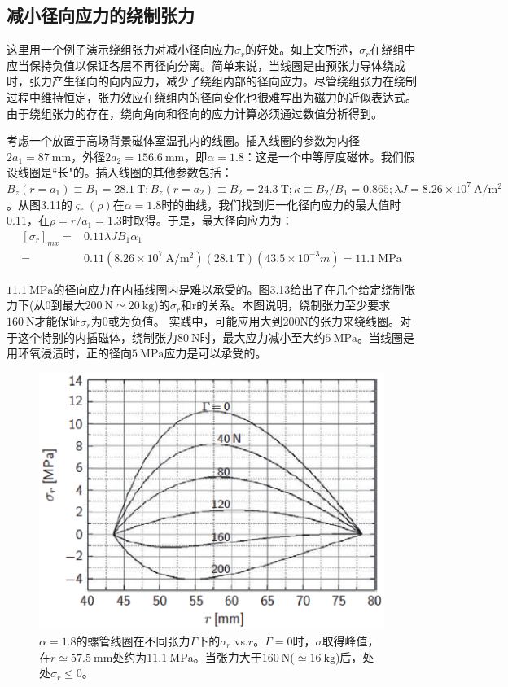 \subsection{减小径向应力的绕制张力}
这里用一个例子演示绕组张力对减小径向应力$\sigma_{r}$的好处。如上文所述，$\sigma_{r}$在绕组中应当保持负值以保证各层不再径向分离。简单来说，当线圈是由预张力导体绕成时，张力产生径向的向内应力，减少了绕组内部的径向应力。尽管绕组张力在绕制过程中维持恒定，张力效应在绕组内的径向变化也很难写出为磁力的近似表达式。由于绕组张力的存在，绕向角向和径向的应力计算必须通过数值分析得到。

考虑一个放置于高场背景磁体室温孔内的线圈。插入线圈的参数为内径$2a_1=87\ \mathrm{mm}$，外径$2a_2=156.6\ \mathrm{mm}$，即$\alpha = 1.8$：这是一个中等厚度磁体。我们假设线圈是``长"的。插入线圈的其他参数包括：
$B_z(r=a_1)\equiv B_1 =28.1\ \mathrm{T}; B_z(r=a_2)\equiv B_2 =24.3\ \mathrm{T};\kappa\equiv B_2/B_1 = 0.865; \lambda J =8.26×10^7 \ \mathrm{A/m^2}$。从图3.11的$\varsigma_r(\rho)$在$\alpha=1.8$时的曲线，我们找到归一化径向应力的最大值时0.11，在$\rho=r/a_1=1.3$时取得。于是，最大径向应力为：
\begin{equation*}
\begin{split}
  [\sigma_r]_{mx}=&0.11\lambda JB_1\alpha_1 \\
   =&0.11(8.26\times 10^7 \ \mathrm{A/m^2})(28.1\ \mathrm{T})(43.5\times 10^{-3}m)=11.1\ \mathrm{MPa}%
\end{split}
\end{equation*}

$11.1\ \mathrm{MPa}$的径向应力在内插线圈内是难以承受的。图3.13给出了在几个给定绕制张力下(从0到最大$200\ \mathrm{N}\simeq 20\ \mathrm{kg}$)的$\sigma_{r}$和r的关系。本图说明，绕制张力至少要求$160\ \mathrm{N}$才能保证$\sigma_{r}$为0或为负值。
实践中，可能应用大到200N的张力来绕线圈。对于这个特别的内插磁体，绕制张力$80\ \mathrm{N}$时，最大应力减小至大约$5\ \mathrm{MPa}$。当线圈是用环氧浸渍时，正的径向$5\ \mathrm{MPa}$应力是可以承受的。
\begin{figure}[htbp]
  \centering
 \includegraphics[scale=0.7]{chpt3/figs/fig3.13.eps}
  \caption{$\alpha=1.8$的螺管线圈在不同张力$\Gamma$下的$\sigma_r$ vs.$r$。$\Gamma=0$时，$\sigma$取得峰值，在$r\simeq 57.5\ \mathrm{mm}$处约为$11.1\ \mathrm{MPa}$。当张力大于$160\ \mathrm{N}$($\simeq 16\ \mathrm{kg}$)后，处处$\sigma_r\le 0 $。}
\end{figure}


